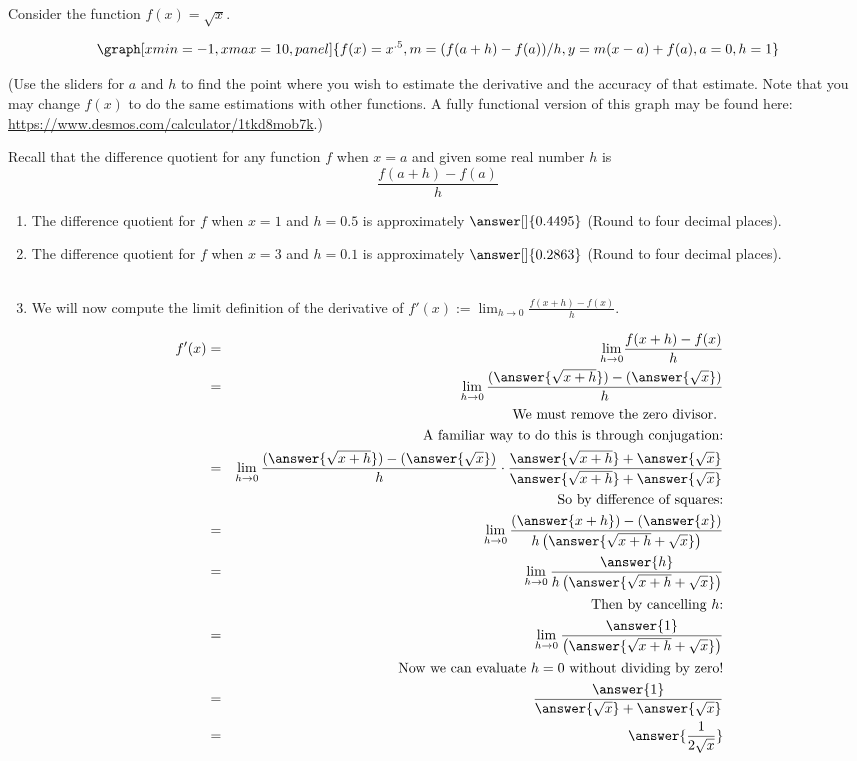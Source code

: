 \documentclass{ximera}
\begin{document}
\begin{question}
Consider the function $f(x)=\sqrt{x}$.  

\begin{onlineOnly}
$$\graph[xmin=-1,xmax=10, panel]{f(x)=x^{.5},m=(f(a+h)-f(a))/h,  y=m(x-a)+f(a), a=0, h=1}$$
\end{onlineOnly}
(Use the sliders for $a$ and $h$ to find the point where you wish to estimate the derivative and the accuracy of that estimate.  Note that you may change $f(x)$ to do the same estimations with other functions.  A fully functional version of this graph may be found here: \url{https://www.desmos.com/calculator/1tkd8mob7k}.)

Recall that the difference quotient for any function $f$ when $x=a$ and given some real number $h$ is $$\frac{f(a+h)-f(a)}{h}$$

\begin{enumerate}
\item The difference quotient for $f$ when $x=1$ and $h=0.5$ is approximately $\answer[ ]{0.4495}$ (Round to four decimal places). 
\item The difference quotient for $f$ when $x=3$ and $h=0.1$ is approximately $\answer[ ]{0.2863}$ (Round to four decimal places).\\ \\
\item We will now compute the limit definition of the derivative of $ f'(x):={\displaystyle \lim_{h\to 0}} \frac{f(x+h)-f(x)}{h}$.

\begin{eqnarray*}
f'(x)&=&{\displaystyle \lim_{h\to 0}} \frac{f(x+h)-f(x)}{h}\\
&=& \displaystyle \lim_{h\to 0}\frac{(\answer{\sqrt{x+h}})-(\answer{\sqrt{x}})}{h}\\
&&\text{We must remove the zero divisor. }\\ && \text{A familiar way to do this is through conjugation:}\\
&=& \displaystyle \lim_{h\to 0}\frac{(\answer{\sqrt{x+h}})-(\answer{\sqrt{x}})}{h}\cdot \frac{\answer{\sqrt{x+h}}+\answer{\sqrt{x}}}{\answer{\sqrt{x+h}}+\answer{\sqrt{x}}}\\
&&\text{So by difference of squares:}\\
&=& \displaystyle \lim_{h\to 0}\frac{(\answer{x+h})-(\answer{x})}{h\left(\answer{\sqrt{x+h}+\sqrt{x}}\right)}\\
&=& \displaystyle \lim_{h\to 0}\frac{\answer{h}}{h\left(\answer{\sqrt{x+h}+\sqrt{x}}\right)}\\
&&\text{Then by cancelling $h$:}\\
&=& \displaystyle \lim_{h\to 0}\frac{\answer{1}}{\left(\answer{\sqrt{x+h}+\sqrt{x}}\right)}\\
&&\text{Now we can evaluate $h=0$ without dividing by zero!}\\
&=&\frac{\answer{1}}{\answer{\sqrt{x}}+\answer{\sqrt{x}}}\\
&=& \answer{\frac{1}{2\sqrt{x}}}
\end{eqnarray*}



\end{enumerate}
\end{question}
\end{document}
